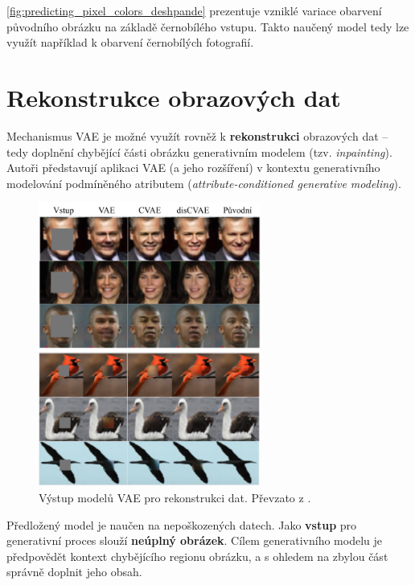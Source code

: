 \autoref{fig:predicting_pixel_colors_deshpande} prezentuje vzniklé variace obarvení původního obrázku na základě černobílého vstupu.
Takto naučený model tedy lze využít například k obarvení černobílých fotografií.

\newpage
\section{Rekonstrukce obrazových dat}
\label{sec:applications_image_reconstruction}
Mechanismus VAE je možné využít rovněž k \textbf{rekonstrukci} obrazových dat – tedy doplnění chybějící části obrázku generativním modelem (tzv. \emph{inpainting}).
Autoři \textcite{Yan2016} představují aplikaci VAE (a jeho rozšíření) v kontextu generativního modelování podmíněného atributem (\emph{attribute-conditioned generative modeling}).

\begin{figure}[H]
    \centering
    \includegraphics[width=0.65\textwidth]{figures/applications/image_inpainting_yan.pdf}
    \caption{Výstup modelů VAE pro rekonstrukci dat. Převzato z \cite{Yan2016}.}
    \label{fig:image_inpainting_yan}
\end{figure}

Předložený model je naučen na nepoškozených datech. Jako \textbf{vstup} pro generativní proces slouží \textbf{neúplný obrázek}.
Cílem generativního modelu je předpovědět kontext chybějícího regionu obrázku, a s ohledem na zbylou část správně doplnit jeho obsah. \cite{Yan2016}

